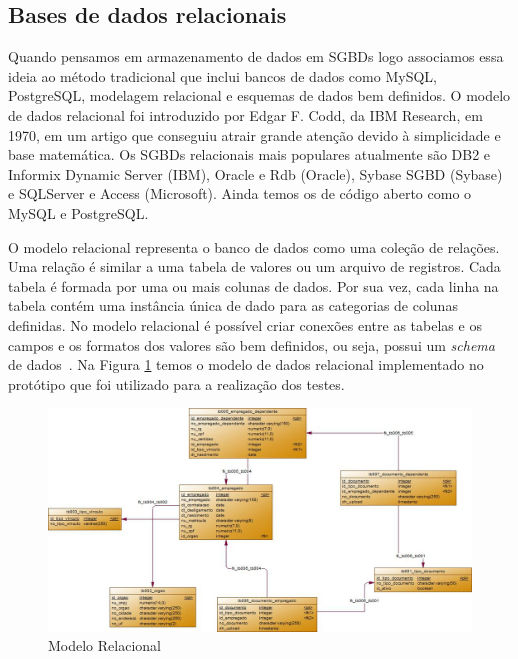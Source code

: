 \subsection{Bases de dados relacionais}

Quando pensamos em armazenamento de dados em SGBDs logo associamos essa ideia ao método tradicional que inclui bancos de dados como MySQL, PostgreSQL, modelagem relacional e esquemas de dados bem definidos. O modelo de dados relacional foi introduzido por Edgar F. Codd, da IBM Research, em 1970, em um artigo que conseguiu atrair grande atenção devido à simplicidade e base matemática. Os SGBDs relacionais mais populares atualmente são DB2 e Informix Dynamic Server (IBM), Oracle e Rdb (Oracle), Sybase SGBD (Sybase) e SQLServer e Access (Microsoft). Ainda temos os de código aberto como o MySQL e PostgreSQL.

O modelo relacional representa o banco de dados como uma coleção de relações. Uma relação é similar a uma tabela de valores ou um arquivo de registros. Cada tabela é formada por uma ou mais colunas de dados. Por sua vez, cada linha na tabela contém uma instância única de dado para as categorias de colunas definidas. No modelo relacional é possível criar conexões entre as tabelas e os  campos e os formatos dos valores são bem definidos, ou seja, possui um \textit{schema} de dados~\cite{SBElmasri,nosqlliveup}. Na Figura \ref{fig:modelorelacional} temos o modelo de dados relacional implementado no protótipo que foi utilizado para a realização dos testes.

	\begin{figure}[!htbp]
		\begin{center}
			\includegraphics[width=1\textwidth]{modelo_relacional}
		\end{center}
		\caption{Modelo Relacional }
		\label{fig:modelorelacional}
	\end{figure}

